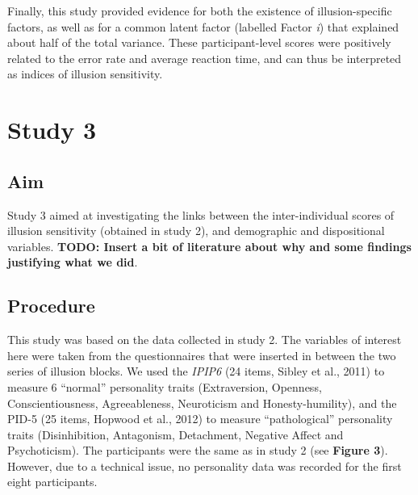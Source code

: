 \documentclass[
  man,floatsintext]{apa6}
\begin{document}
Finally, this study provided evidence for both the existence of illusion-specific factors, as well as for a common latent factor (labelled Factor \emph{i}) that explained about half of the total variance. These participant-level scores were positively related to the error rate and average reaction time, and can thus be interpreted as indices of illusion sensitivity.

\hypertarget{study-3}{%
\section{Study 3}\label{study-3}}

\hypertarget{aim-2}{%
\subsection{Aim}\label{aim-2}}

Study 3 aimed at investigating the links between the inter-individual scores of illusion sensitivity (obtained in study 2), and demographic and dispositional variables. \textbf{TODO: Insert a bit of literature about why and some findings justifying what we did}.

\hypertarget{procedure-2}{%
\subsection{Procedure}\label{procedure-2}}

This study was based on the data collected in study 2. The variables of interest here were taken from the questionnaires that were inserted in between the two series of illusion blocks. We used the \emph{IPIP6} (24 items, Sibley et al., 2011) to measure 6 ``normal'' personality traits (Extraversion, Openness, Conscientiousness, Agreeableness, Neuroticism and Honesty-humility), and the PID-5 (25 items, Hopwood et al., 2012) to measure ``pathological'' personality traits (Disinhibition, Antagonism, Detachment, Negative Affect and Psychoticism). The participants were the same as in study 2 (see \textbf{Figure 3}). However, due to a technical issue, no personality data was recorded for the first eight participants.
\end{document}
